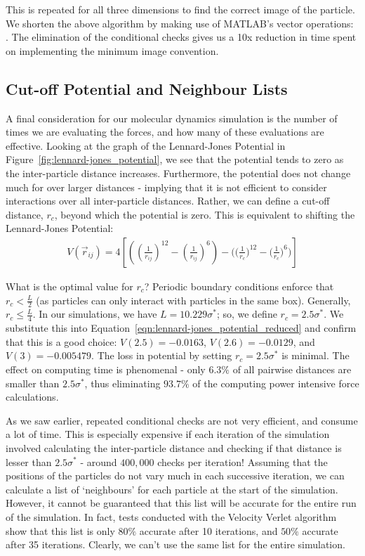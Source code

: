 \documentclass[../Main.tex]{subfiles}
\begin{document}
This is repeated for all three dimensions to find the correct image of the particle.
We shorten the above algorithm by making use of MATLAB's vector operations: . The elimination of the conditional checks gives us a 10x reduction in time spent on implementing the minimum image convention.

\subsection{Cut-off Potential and Neighbour Lists}

A final consideration for our molecular dynamics simulation is the number of times we are evaluating the forces, and how many of these evaluations are effective. Looking at the graph of the Lennard-Jones Potential in Figure~\ref{fig:lennard-jones_potential}, we see that the potential tends to zero as the inter-particle distance increases. Furthermore, the potential does not change much for over larger distances - implying that it is not efficient to consider interactions over all inter-particle distances. Rather, we can define a cut-off distance, $r_{c}$, beyond which the potential is zero. This is equivalent to shifting the Lennard-Jones Potential:
\begin{align}
	V\left(\vec{r}_{ij}\right) = 4 \left[ \left(\left( \frac{1}{r_{ij}}\right)^{12} - \left( \frac{1}{r_{ij}}\right)^{6}\right) - \Bigg(\bigg( \frac{1}{r_{c}}\bigg)^{12} - \bigg( \frac{1}{r_{c}}\bigg)^{6}\Bigg) \right]   \label{eqn:lennard-jones_potential_reduced_shifted}
\end{align}

What is the optimal value for $r_{c}$? Periodic boundary conditions enforce that $r_{c} < \frac{L}{2}$ (as particles can only interact with particles in the same box). Generally, $r_{c} \leq \frac{L}{4}$\cite{FrenkelSmit2001}. In our simulations, we have $L = 10.229\sigma^{*}$; so, we define $r_{c} = 2.5\sigma^{*}$. We substitute this into Equation~\ref{eqn:lennard-jones_potential_reduced} and confirm that this is a good choice: $V(2.5) = -0.0163$, $V(2.6) = -0.0129$, and $V(3) = -0.005479$. The  loss in potential by setting $r_{c} = 2.5\sigma^{*}$ is minimal. The effect on computing time is phenomenal - only $6.3\%$ of all pairwise distances are smaller than $2.5\sigma^{*}$, thus eliminating $93.7\%$ of the computing power intensive force calculations.

As we saw earlier, repeated conditional checks are not very efficient, and consume a lot of time. This is especially expensive if each iteration of the simulation involved calculating the inter-particle distance and checking if that distance is lesser than $2.5 \sigma^{*}$ - around $400,000$ checks per iteration! Assuming that the positions of the particles do not vary much in each successive iteration, we can calculate a list of `neighbours' for each particle at the start of the simulation. However, it cannot be guaranteed that this list will be accurate for the entire run of the simulation. In fact, tests conducted with the Velocity Verlet algorithm show that this list is only $80\%$ accurate after 10 iterations, and $50\%$ accurate after 35 iterations. Clearly, we can't use the same list for the entire simulation.
\end{document}
